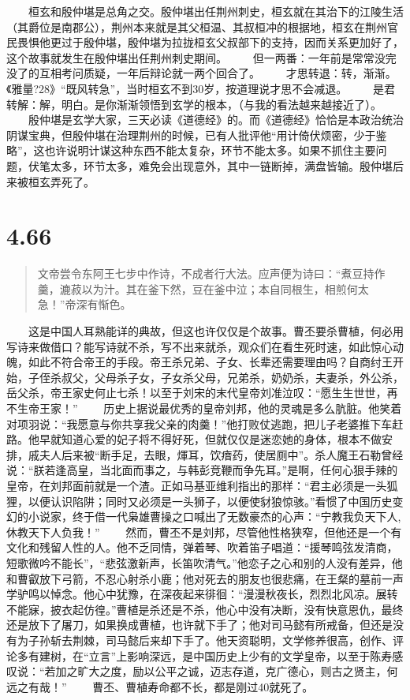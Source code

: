 \documentclass[]{book}
\begin{document}
　　桓玄和殷仲堪是总角之交。殷仲堪出任荆州刺史，桓玄就在其治下的江陵生活（其爵位是南郡公），荆州本来就是其父桓温、其叔桓冲的根据地，桓玄在荆州官民畏惧他更过于殷仲堪，殷仲堪为拉拢桓玄父叔部下的支持，因而关系更加好了，这个故事就发生在殷仲堪出任荆州刺史期间。
　　但一两番：一年前是常常没完没了的互相考问质疑，一年后辩论就一两个回合了。
　　才思转退：转，渐渐。《雅量?28》``既风转急''，当时桓玄不到30岁，按道理说才思不会减退。
　　是君转解：解，明白。是你渐渐领悟到玄学的根本，（与我的看法越来越接近了）。
　　殷仲堪是玄学大家，三天必读《道德经》的。而《道德经》恰恰是本政治统治阴谋宝典，但殷仲堪在治理荆州的时候，已有人批评他``用计倚伏烦密，少于鉴略''，这也许说明计谋这种东西不能太复杂，环节不能太多。如果不抓住主要问题，伏笔太多，环节太多，难免会出现意外，其中一链断掉，满盘皆输。殷仲堪后来被桓玄弄死了。

\section{4.66}\label{section-243}

\begin{quote}
文帝尝令东阿王七步中作诗，不成者行大法。应声便为诗曰：``煮豆持作羹，漉菽以为汁。其在釜下然，豆在釜中泣；本自同根生，相煎何太急！''帝深有惭色。
\end{quote}

　　这是中国人耳熟能详的典故，但这也许仅仅是个故事。曹丕要杀曹植，何必用写诗来做借口？能写诗就不杀，写不出来就杀，观众们在看生死时速，如此惊心动魄，如此不符合帝王的手段。帝王杀兄弟、子女、长辈还需要理由吗？自商纣王开始，子侄杀叔父，父母杀子女，子女杀父母，兄弟杀，奶奶杀，夫妻杀，外公杀，岳父杀，帝王家史何止七杀！以至于刘宋的末代皇帝刘准泣叹：``愿生生世世，再不生帝王家！''
　　历史上据说最优秀的皇帝刘邦，他的灵魂是多么肮脏。他笑着对项羽说：``我愿意与你共享我父亲的肉羹！''他打败仗逃跑，把儿子老婆推下车赶路。他早就知道心爱的妃子将不得好死，但就仅仅是迷恋她的身体，根本不做安排，戚夫人后来被``断手足，去眼，煇耳，饮瘖药，使居厕中''。杀人魔王石勒曾经说：``朕若逢高皇，当北面而事之，与韩彭竞鞭而争先耳。''是啊，任何心狠手辣的皇帝，在刘邦面前就是一个渣。正如马基亚维利指出的那样：``君主必须是一头狐狸，以便认识陷阱；同时又必须是一头狮子，以便使豺狼惊骇。''看惯了中国历史变幻的小说家，终于借一代枭雄曹操之口喊出了无数豪杰的心声：``宁教我负天下人,休教天下人负我！''
　　然而，曹丕不是刘邦，尽管他性格狭窄，但他还是一个有文化和残留人性的人。他不乏同情，弹着琴、吹着笛子唱道：``援琴鸣弦发清商，短歌微吟不能长''，``悲弦激新声，长笛吹清气。''他恋子之心和别的人没有差异，他和曹叡放下弓箭，不忍心射杀小鹿；他对死去的朋友也很悲痛，在王粲的墓前一声学驴鸣以悼念。他心中犹豫，在深夜起来徘徊：``漫漫秋夜长，烈烈北风凉。展转不能寐，披衣起仿徨。''曹植是杀还是不杀，他心中没有决断，没有快意恩仇，最终还是放下了屠刀，如果换成曹植，也许就下手了；他对司马懿有所戒备，但还是没有为子孙斩去荆棘，司马懿后来却下手了。他天资聪明，文学修养很高，创作、评论多有建树，在``立言''上影响深远，是中国历史上少有的文学皇帝，以至于陈寿感叹说：``若加之旷大之度，励以公平之诚，迈志存道，克广德心，则古之贤主，何远之有哉！''
　　曹丕、曹植寿命都不长，都是刚过40就死了。
\end{document}
